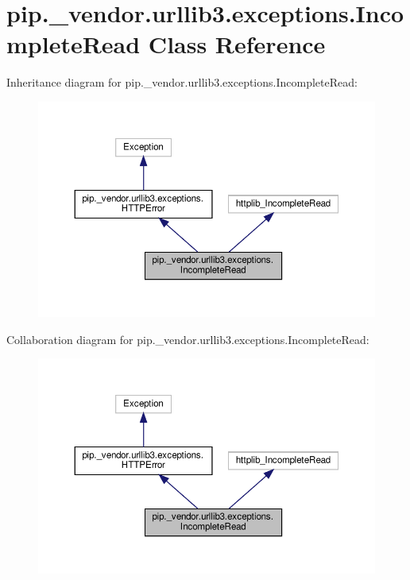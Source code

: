 \hypertarget{classpip_1_1__vendor_1_1urllib3_1_1exceptions_1_1IncompleteRead}{}\section{pip.\+\_\+vendor.\+urllib3.\+exceptions.\+Incomplete\+Read Class Reference}
\label{classpip_1_1__vendor_1_1urllib3_1_1exceptions_1_1IncompleteRead}


Inheritance diagram for pip.\+\_\+vendor.\+urllib3.\+exceptions.\+Incomplete\+Read\+:
\nopagebreak
\begin{figure}[H]
\begin{center}
\leavevmode
\includegraphics[width=350pt]{classpip_1_1__vendor_1_1urllib3_1_1exceptions_1_1IncompleteRead__inherit__graph}
\end{center}
\end{figure}


Collaboration diagram for pip.\+\_\+vendor.\+urllib3.\+exceptions.\+Incomplete\+Read\+:
\nopagebreak
\begin{figure}[H]
\begin{center}
\leavevmode
\includegraphics[width=350pt]{classpip_1_1__vendor_1_1urllib3_1_1exceptions_1_1IncompleteRead__coll__graph}
\end{center}
\end{figure}
